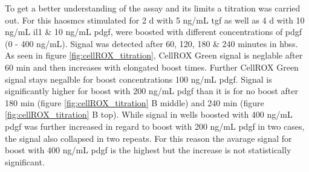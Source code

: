     To get a better understanding of the assay and its limits a titration was carried out. For this \acp{haosmc} stimulated for 2 d with 5 ng/mL \ac{tgf} as well as 4 d with 10 ng/mL  \ac{il1} \& 10 ng/mL  \ac{pdgf}, were boosted with different concentrations of \ac{pdgf} (0 - 400 ng/mL). Signal was detected after 60, 120, 180 \& 240 minutes in \ac{hbss}. As seen in figure \ref{fig:cellROX_titration}, CellROX Green signal is neglable after 60 min and then increases with elongated boost times. Further CellROX Green signal stays negalble for boost concentrations 100 ng/mL \ac{pdgf}. Signal is significantly higher for boost with 200 ng/mL \ac{pdgf} than it is for no boost after 180 min (figure \ref{fig:cellROX_titration} B middle) and 240 min (figure \ref{fig:cellROX_titration} B top). While signal in wells boosted with 400 ng/mL \ac{pdgf} was further increased in regard to boost with 200 ng/mL \ac{pdgf} in two cases, the signal also collapsed in two repeats. For this reason the avarage signal for boost with 400 ng/mL \ac{pdgf} is the highest but the increase is not statistically significant.

